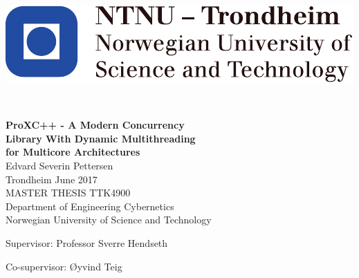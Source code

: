 
\thispagestyle{empty}

\begin{center}
\includegraphics{fig/NTNU}
\end{center}

\mbox{}\\[6pc]
\begin{center}
\Huge\textbf{ProXC++ - A Modern Concurrency\\ Library With Dynamic Multithreading\\ for Multicore Architectures}\\[2pc]

\Large{Edvard Severin Pettersen}\\[1pc]
\large{Trondheim June 2017}\\[2pc]

MASTER THESIS TTK4900\\
Department of Engineering Cybernetics\\
Norwegian University of Science and Technology
\end{center}
\vfill

\noindent Supervisor: Professor Sverre Hendseth

\noindent Co-supervisor: Øyvind Teig

\afterpage{\blankpage}

